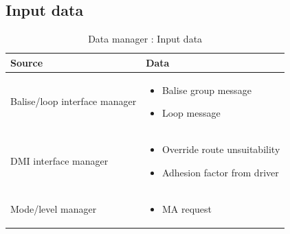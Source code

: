 \documentclass[nocc]{template/openetcs_report}
\begin{document}
\subsection{Input data}
			\begin{longtable}{|l|l|}
				\caption{Data manager : Input data}\\ 
				\hline
				
					\begin{minipage}[t]{0.35\linewidth} \textbf{Source}	\end{minipage} 
				&	\begin{minipage}[t]{0.65\linewidth} \textbf{Data} \end{minipage} \\
				
				\hline
																																									
					\begin{minipage}[t]{0.35\linewidth} Balise/loop interface manager	\end{minipage} 
				&	\begin{minipage}[t]{0.65\linewidth}
						\begin{itemize}
							\item Balise group message
							\item Loop message						
						\end{itemize}
					\end{minipage} \\
				
				\hline
				
					\begin{minipage}[t]{0.35\linewidth} DMI interface manager	\end{minipage} 
				&	\begin{minipage}[t]{0.65\linewidth}
						\begin{itemize}
							\item Override route unsuitability
							\item Adhesion factor from driver
						\end{itemize}			
					\end{minipage} \\
				
				\hline
					
					\begin{minipage}[t]{0.35\linewidth} Mode/level manager	\end{minipage} 
				&	\begin{minipage}[t]{0.65\linewidth}
						\begin{itemize}
							\item MA request
						\end{itemize}			
					\end{minipage} \\
				

\end{longtable}
\end{document}

